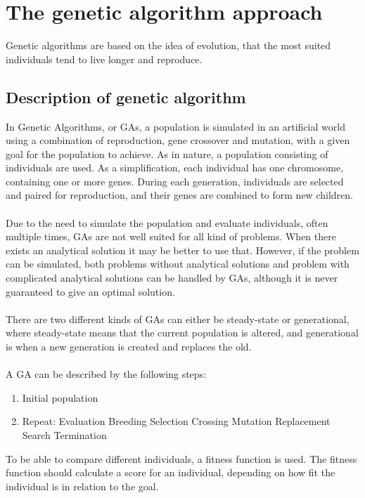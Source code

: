 \pagebreak
\section{The genetic algorithm approach}
Genetic algorithms are based on the idea of evolution, that the most suited individuals tend to live longer and reproduce. 
\subsection{Description of genetic algorithm}
In Genetic Algorithms, or GAs, a population is simulated in an artificial world using a combination of reproduction, gene crossover and mutation, with a given goal for the population to achieve. As in nature, a population consisting of individuals are used. As a simplification, each individual has one chromosome, containing one or more genes. During each generation, individuals are selected and paired for reproduction, and their genes are combined to form new children.\\
\\
Due to the need to simulate the population and evaluate individuals, often multiple times, GAs are not well suited for all kind of problems. When there exists an analytical solution it may be better to use that. However, if the problem can be simulated, both problems without analytical solutions and problem with complicated analytical solutions can be handled by GAs, although it is never guaranteed to give an optimal solution.\\
\\There are two different kinds of GAs can either be steady-state or generational, where steady-state means that the current population is altered, and generational is when a new generation is created and replaces the old.\\
\\
A GA can be described by the following steps:
\begin{enumerate}
\item Initial population
\item Repeat:
\subitem Evaluation
\subitem Breeding
\subsubitem Selection
\subsubitem Crossing
\subsubitem Mutation
\subsubitem Replacement
\subitem Search Termination
\end{enumerate}
To be able to compare different individuals, a fitness function is used. The fitness function should calculate a score for an individual, depending on how fit the individual is in relation to the goal.\\
